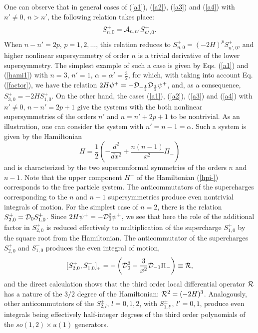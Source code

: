 \documentclass[a4paper,12pt]{article}
\begin{document}
One can observe that
in general cases of (\ref{a1}),
(\ref{a2}), (\ref{a3}) and (\ref{a4})
with $n'\neq 0$, $n>n'$,
the following relation takes place:
\begin{equation}
S^+_{n,0}={\cal A}_{n,n'}S^+_{n',0}.
\label{cala}
\end{equation}
When $n-n'=2p$, $p=1,2,\ldots$,
this relation reduces to
$S^+_{n,0}=(-2H)^pS^+_{n',0}$,
and higher nonlinear supersymmetry of order $n$
is a trivial derivative of the lower supersymmetry.
The simplest example of such a case is given
by Eqs. (\ref{a1}) and (\ref{hami1})
with $n=3$, $n'=1$, $\alpha=\alpha'=\frac{3}{2}$,
for which, with taking into account Eq.
(\ref{factor}), we have the relation
$2H\psi^+=-{\cal D}_{-\frac{1}{2}}
{\cal D}_{\frac{1}{2}}\psi^+$,
and, as a consequence,
$S^+_{3,0}=-2HS^+_{1,0}$.
On the other hand,
the cases (\ref{a1}),
(\ref{a2}), (\ref{a3}) and (\ref{a4})
with $n'\neq 0$, $n-n'=2p+1$
give the systems with the both nonlinear supersymmetries
of the orders $n'$ and $n=n'+2p+1$ to be nontrivial.
As an illustration, one can consider the
system with $n'=n-1=\alpha$.
Such a system is given by the Hamiltonian
\begin{equation}
H=\frac{1}{2}\left(-\frac{d^2}{dx^2}+\frac{n(n-1)}{x^2}\Pi_-
\right)
\label{hpi-}
\end{equation}
and is characterized by the two superconformal
symmetries of the orders $n$ and $n-1$.
Note that the upper component $H^+$ of the Hamiltonian
(\ref{hpi-}) corresponds to the free particle system.
The anticommutators of the supercharges
corresponding to the
$n$ and $n-1$ supersymmetries
produce even nontrivial integrals of motion.
For the simplest case of $n=2$,
there is the relation
$S^+_{2,0}={\cal D}_0S^+_{1,0}$.
Since $2H\psi^+=-{\cal D}_0^2\psi^+$,
we see that here the role of the additional factor
in $S^+_{2,0}$ is reduced effectively to multiplication of
the supercharge $S^+_{1,0}$ by the square root from the
Hamiltonian.
The anticommutator of the supercharges $S^+_{2,0}$ and
$S^-_{1,0}$ produces the even integral of motion,
$$
[S^+_{2,0},S^-_{1,0}]_{{}_+}=
-\left({\cal D}_0^3-\frac{3}{x^2}{\cal D}_{-1}\Pi_-\right)
\equiv {\cal R},
$$
and the direct calculation
shows that the third order local differential operator
${\cal R}$ has a nature of the $3/2$ degree of the
Hamiltonian:
${\cal R}^2=(-2H)^3$.
Analogously, other anticommutators
of the $S^\pm_{2,l}$, $l=0,1,2$,
with $S^\pm_{1,l'}$, $l'=0,1$,
produce even integrals being effectively
half-integer degrees of the
third order polynomials
of the $so(1,2)\times u(1)$ generators.
\end{document}

